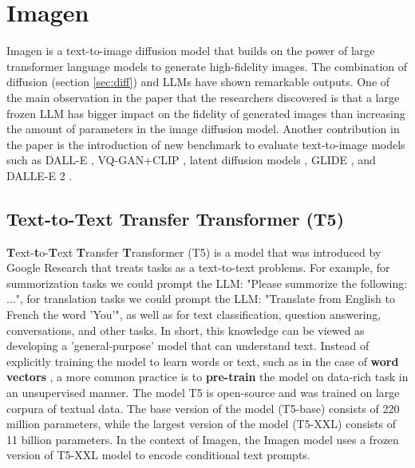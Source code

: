 \section{Imagen}

Imagen \cite{imagen} is a text-to-image diffusion model that builds on the power of large transformer language models \cite{transformer} to generate high-fidelity images. The combination of diffusion (section \ref{sec:diff}) and LLMs have shown remarkable outputs. One of the main observation in the paper that the researchers discovered is that a large frozen LLM has bigger impact on the fidelity of generated images than increasing the amount of parameters in the image diffusion model. Another contribution in the paper is the introduction of new benchmark to evaluate text-to-image models such as DALL-E \cite{dalle}, VQ-GAN+CLIP \cite{vqgan_clip}, latent diffusion models \cite{stable_diffusion}, GLIDE \cite{glide}, and DALLE-E 2 \cite{dalle_2}.










\subsection{Text-to-Text Transfer Transformer (T5)}

\textbf{T}ext-\textbf{t}o-\textbf{T}ext \textbf{T}ransfer \textbf{T}ransformer (T5) \cite{t5_model} is a model that was introduced by Google Research that treats tasks as a text-to-text problems. For example, for summorization tasks we could prompt the LLM: "Please summorize the following: ...", for translation tasks we could prompt the LLM: "Translate from English to French the word 'You'", as well as for text classification, question answering, conversations, and other tasks. In short, this knowledge can be viewed as developing a 'general-purpose' model that can understand text.  Instead of explicitly training the model to learn words or text, such as in the case of \textbf{word vectors} \cite{cbow_word2vec}, a more common practice is to \textbf{pre-train} \cite{bert} the model on data-rich task in an unsupervised manner. The model T5 is open-source and was trained on large corpura of textual data. The base version of the model (T5-base) consists of 220 million parameters, while the largest version of the model (T5-XXL) consists of 11 billion parameters. In the context of Imagen, the Imagen model uses a frozen version of T5-XXL model to encode conditional text prompts.

